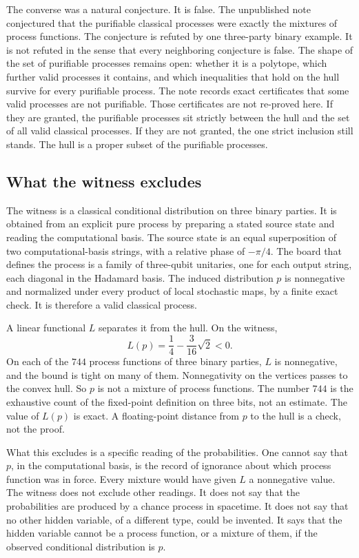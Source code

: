 \documentclass[11pt]{article}
\begin{document}
The converse was a natural conjecture. It is false. The unpublished note conjectured that the purifiable classical processes were exactly the mixtures of process functions. The conjecture is refuted by one three-party binary example. It is not refuted in the sense that every neighboring conjecture is false. The shape of the set of purifiable processes remains open: whether it is a polytope, which further valid processes it contains, and which inequalities that hold on the hull survive for every purifiable process. The note records exact certificates that some valid processes are not purifiable. Those certificates are not re-proved here. If they are granted, the purifiable processes sit strictly between the hull and the set of all valid classical processes. If they are not granted, the one strict inclusion still stands. The hull is a proper subset of the purifiable processes.

\subsection{What the witness excludes}
\label{sec:wit}

The witness is a classical conditional distribution on three binary parties. It is obtained from an explicit pure process by preparing a stated source state and reading the computational basis. The source state is an equal superposition of two computational-basis strings, with a relative phase of \(-\pi/4\). The board that defines the process is a family of three-qubit unitaries, one for each output string, each diagonal in the Hadamard basis. The induced distribution \(p\) is nonnegative and normalized under every product of local stochastic maps, by a finite exact check. It is therefore a valid classical process.

A linear functional \(L\) separates it from the hull. On the witness,
\[
L(p) = \frac14 - \frac{3}{16}\sqrt{2} < 0.
\]
On each of the \(744\) process functions of three binary parties, \(L\) is nonnegative, and the bound is tight on many of them. Nonnegativity on the vertices passes to the convex hull. So \(p\) is not a mixture of process functions. The number \(744\) is the exhaustive count of the fixed-point definition on three bits, not an estimate. The value of \(L(p)\) is exact. A floating-point distance from \(p\) to the hull is a check, not the proof.

What this excludes is a specific reading of the probabilities. One cannot say that \(p\), in the computational basis, is the record of ignorance about which process function was in force. Every mixture would have given \(L\) a nonnegative value. The witness does not exclude other readings. It does not say that the probabilities are produced by a chance process in spacetime. It does not say that no other hidden variable, of a different type, could be invented. It says that the hidden variable cannot be a process function, or a mixture of them, if the observed conditional distribution is \(p\).
\end{document}
